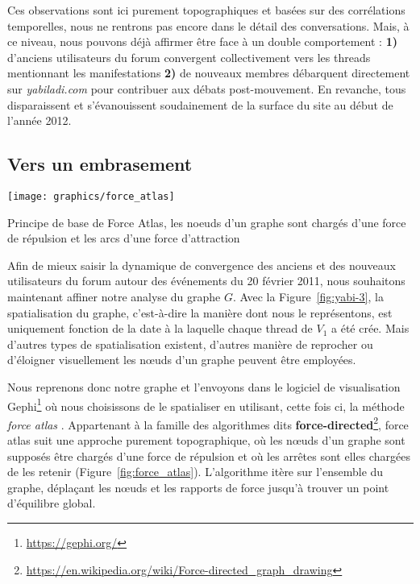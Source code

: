 \documentclass[symmetric,justified,marginals=raggedouter]{tufte-book}
\begin{document}
\noindent Ces observations sont ici purement topographiques et basées sur des corrélations temporelles, nous ne rentrons pas encore dans le détail des conversations. Mais, à ce niveau, nous pouvons déjà affirmer être face à un double comportement : \textbf{1)} d'anciens utilisateurs du forum convergent collectivement vers les threads mentionnant les manifestations \textbf{2)} de nouveaux membres débarquent directement sur \textit{yabiladi.com} pour contribuer aux débats post-mouvement. En revanche, tous disparaissent et s'évanouissent soudainement de la surface du site au début de l'année 2012.

\subsection{Vers un embrasement}

\begin{marginfigure}%
  \texttt{[image: graphics/force\_atlas]}
  \vspace*{0.2cm}  
  \caption{Principe de base de Force Atlas, les noeuds d'un graphe sont chargés d'une force de répulsion et les arcs d'une force d'attraction}
  \label{fig:force_atlas}
\end{marginfigure} 

\noindent Afin de mieux saisir la dynamique de convergence des anciens et des nouveaux utilisateurs du forum autour des événements du 20 février 2011, nous souhaitons maintenant affiner notre analyse du graphe $G$. Avec la Figure~\ref{fig:yabi-3}, la spatialisation du graphe, c'est-à-dire la manière dont nous le représentons, est uniquement fonction de la date à la laquelle chaque thread de $V_1$ a été crée. Mais d'autres types de spatialisation existent, d'autres manière de reprocher ou d'éloigner visuellement les nœuds d'un graphe peuvent être employées. 

Nous reprenons donc notre graphe et l'envoyons dans le logiciel de visualisation Gephi\footnote{\RaggedOuter \url{https://gephi.org/}} où nous choisissons de le spatialiser en utilisant, cette fois ci, la méthode \textit{force atlas} \citep{jacomy_forceatlas2_2014}. Appartenant à la famille des algorithmes dits \textbf{force-directed}\footnote{\RaggedOuter \url{https://en.wikipedia.org/wiki/Force-directed_graph_drawing}}, force atlas suit une approche purement topographique, où les nœuds  
d'un graphe sont supposés être chargés d'une force de répulsion et où les arrêtes sont elles chargées de les retenir (Figure~\ref{fig:force_atlas}). L'algorithme itère sur l'ensemble du graphe, déplaçant les nœuds et les rapports de force jusqu'à trouver un point d'équilibre global.
\end{document}
